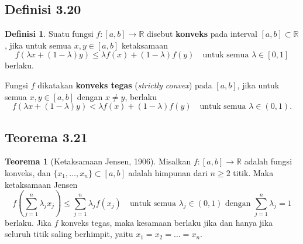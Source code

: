 \documentclass[aspectratio=169,11pt]{beamer}
\theoremstyle{definition}
\newtheorem{definisi}{Definisi}
\newtheorem{teorema}{Teorema}
\newcommand{\R}{\mathbb{R}}
\begin{document}
\subsection{Definisi 3.20}

\begin{frame}{\insertsection}{\insertsubsection}
  \setcounter{definisi}{19}
  \begin{definisi}
    Suatu fungsi $f : [a,b] \to \R$ disebut \textbf{konveks} pada interval $[a,b] \subset \R$, jika untuk semua $x,y \in [a,b]$ ketaksamaan\label{def:3.20}
    \begin{equation*}
      f(\lambda x + (1 - \lambda)y) \leq \lambda f(x) + (1 - \lambda)f(y) \quad \text{untuk semua } \lambda \in [0,1]
    \end{equation*}
    berlaku.

    Fungsi $f$ dikatakan \textbf{konveks tegas} (\textit{strictly convex}) pada $[a,b]$, jika untuk semua $x,y \in [a,b]$ dengan $x \neq y$, berlaku
    \begin{equation*}
      f(\lambda x + (1 - \lambda)y) < \lambda f(x) + (1 - \lambda)f(y) \quad \text{untuk semua } \lambda \in (0,1).
    \end{equation*}
  \end{definisi}
\end{frame}

\subsection{Teorema 3.21}

\begin{frame}{\insertsection}{\insertsubsection}
  \setcounter{teorema}{20}
  \begin{teorema}[Ketaksamaan Jensen, 1906]\label{thm:3.21}
    Misalkan $f : [a,b] \to \R$ adalah fungsi konveks, dan $\{x_1, \dots, x_n\} \subset [a,b]$ adalah himpunan dari $n \geq 2$ titik. Maka ketaksamaan Jensen
    \begin{equation*}
      f\left( \sum_{j=1}^n \lambda_j x_j \right) \leq \sum_{j=1}^n \lambda_j f(x_j) \quad \text{untuk semua } \lambda_j \in (0,1) \text{ dengan } \sum_{j=1}^n \lambda_j = 1
    \end{equation*}
    berlaku. Jika $f$ konveks tegas, maka kesamaan berlaku jika dan hanya jika seluruh titik saling berhimpit, yaitu $x_1 = x_2 = \dots = x_n$.
  \end{teorema}
\end{frame}
\end{document}
